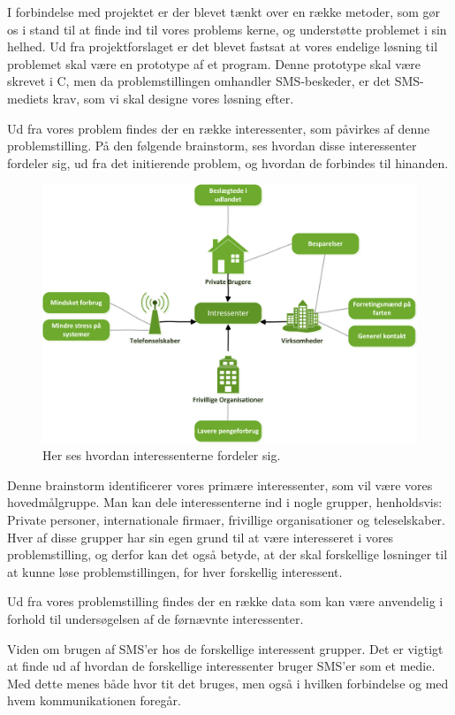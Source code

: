 I forbindelse med projektet er der blevet tænkt over en række metoder, som gør os i stand til at finde ind til vores problems kerne, og understøtte problemet i sin helhed.
Ud fra projektforslaget er det blevet fastsat at vores endelige løsning til problemet skal være en prototype af et program. Denne prototype skal være skrevet i C, men da problemstillingen omhandler SMS-beskeder, er det  SMS-mediets krav, som vi skal designe vores løsning efter.


Ud fra vores problem findes der en række interessenter, som påvirkes af denne problemstilling.
På den følgende brainstorm, ses hvordan disse interessenter fordeler sig, ud fra det initierende problem, og hvordan de forbindes til hinanden.

\begin{figure}[H]
\includegraphics[width=\linewidth]{Billeder/Brainstormting.png}
\caption{Her ses hvordan interessenterne fordeler sig.}
\end{figure}

Denne brainstorm identificerer vores primære interessenter, som vil være vores hovedmålgruppe.
Man kan dele interessenterne ind i nogle grupper, henholdsvis: Private personer, internationale firmaer, frivillige organisationer og teleselskaber.
Hver af disse grupper har sin egen grund til at være interesseret i vores problemstilling, og derfor kan det også betyde, at der skal forskellige løsninger til at kunne løse problemstillingen, for hver forskellig interessent.


Ud fra vores problemstilling findes der en række data som kan være anvendelig i forhold til undersøgelsen af de førnævnte interessenter.


Viden om brugen af SMS'er hos de forskellige interessent grupper.
Det er vigtigt at finde ud af hvordan de forskellige interessenter bruger SMS'er som et medie. Med dette menes både hvor tit det bruges, men også i hvilken forbindelse og med hvem kommunikationen foregår.